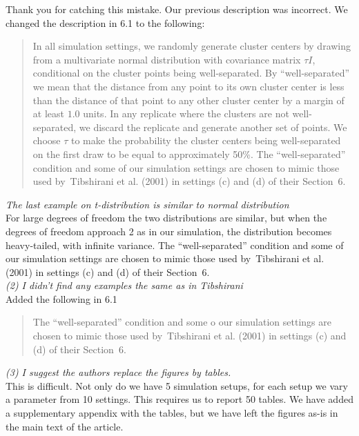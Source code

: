 \documentclass[11pt]{article}
\begin{document}
Thank you for catching this mistake. Our previous description was
incorrect. We changed the description in 6.1 to the following:

\begin{quote}
In all simulation settings, we randomly generate cluster centers by drawing
from a multivariate normal distribution with covariance matrix $\tau I$,
conditional on the cluster points being well-separated. By ``well-separated''
we mean that the distance from any point to its own cluster center is less
than the distance of that point to any other cluster center by a margin of at
least $1.0$ units. In any replicate where the clusters are not well-separated,
we discard the replicate and generate another set of points.  We choose $\tau$
to make the probability the cluster centers being well-separated on the first
draw to be equal to approximately 50\%.  The ``well-separated'' condition and
some of our simulation settings are chosen to mimic those used by~Tibshirani
et al. (2001) in settings (c) and (d) of their Section~6.
\end{quote}

\noindent
\emph{The last example on t-distribution is similar to normal distribution}
\\

For large degrees of freedom the two distributions are similar, but when the
degrees of freedom approach 2 as in our simulation, the distribution becomes
heavy-tailed, with infinite variance.  The ``well-separated'' condition and
some of our simulation settings are chosen to mimic those used by~Tibshirani
et al. (2001) in settings (c) and (d) of their Section~6.
\\

\noindent
\emph{(2) I didn't find any examples the same as in Tibshirani}
\\

Added the following in 6.1

\begin{quote}
The ``well-separated'' condition and
some o our simulation settings are chosen to mimic those used by~Tibshirani
et al. (2001) in settings (c) and (d) of their Section~6.
\end{quote}

\noindent
\emph{(3) I suggest the authors replace the figures by tables.}
\\

This is difficult. Not only do we have 5 simulation setups, for each setup we
vary a parameter from 10 settings. This requires us to report 50 tables. We
have added a supplementary appendix with the tables, but we have left the
figures as-is in the main text of the article.
\end{document}
